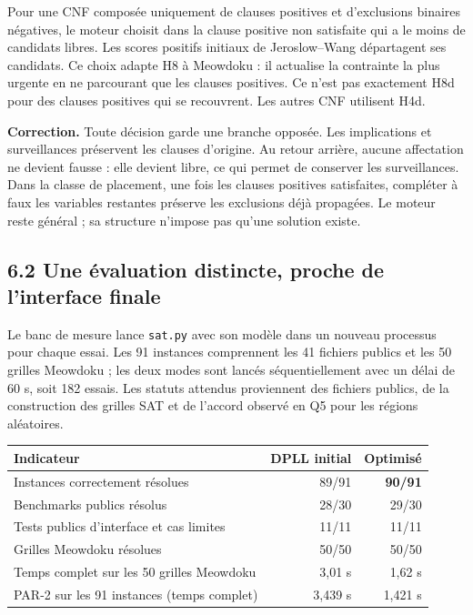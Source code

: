 \documentclass[11pt,a4paper]{article}
\begin{document}
Pour une CNF composée uniquement de clauses positives et d'exclusions
binaires négatives, le moteur choisit dans la clause positive non satisfaite
qui a le moins de candidats libres. Les scores positifs initiaux de
Jeroslow--Wang départagent ses candidats. Ce choix adapte H8 à Meowdoku :
il actualise la contrainte la plus urgente en ne parcourant que les
clauses positives. Ce n'est pas exactement H8d pour des clauses positives
qui se recouvrent. Les autres CNF utilisent H4d.

\textbf{Correction.} Toute décision garde une branche opposée.
Les implications et surveillances préservent les clauses d'origine.
Au retour arrière, aucune affectation ne devient fausse : elle devient
libre, ce qui permet de conserver les surveillances. Dans la classe de
placement, une fois les clauses positives satisfaites, compléter à faux
les variables restantes préserve les exclusions déjà propagées.
Le moteur reste général ; sa structure n'impose pas qu'une solution existe.

\subsection*{6.2 Une évaluation distincte, proche de l'interface finale}

Le banc de mesure lance \texttt{sat.py} avec son modèle dans un nouveau
processus pour chaque essai. Les 91 instances comprennent les 41 fichiers
publics et les 50 grilles Meowdoku ; les deux modes sont lancés
séquentiellement avec un délai de 60 s, soit 182 essais.
Les statuts attendus proviennent des fichiers publics, de la construction
des grilles SAT et de l'accord observé en Q5 pour les régions aléatoires.

\begin{center}\small
\begin{tabular}{lrr}
\toprule
Indicateur & DPLL initial & Optimisé \\
\midrule
Instances correctement résolues & 89/91 & \textbf{90/91} \\
Benchmarks publics résolus & 28/30 & 29/30 \\
Tests publics d'interface et cas limites & 11/11 & 11/11 \\
Grilles Meowdoku résolues & 50/50 & 50/50 \\
Temps complet sur les 50 grilles Meowdoku & 3,01 s & 1,62 s \\
PAR-2 sur les 91 instances (temps complet) & 3,439 s & 1,421 s \\
\bottomrule
\end{tabular}
\end{center}
\end{document}
